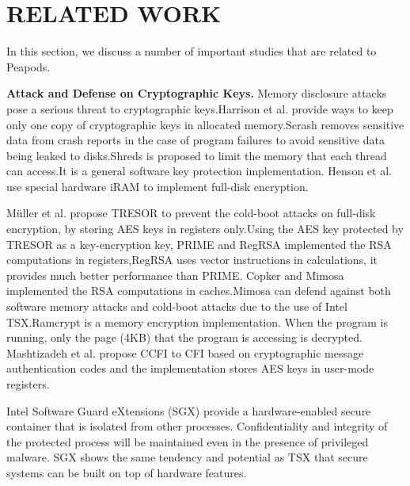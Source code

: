 
\section{RELATED WORK}
In this section, we discuss a number of important studies that are related to Peapods.

\textbf{Attack and Defense on Cryptographic Keys.}
Memory disclosure attacks pose a serious threat to cryptographic keys.Harrison et al. provide ways to keep only one copy of cryptographic keys in allocated memory\cite{Harrison2007Protecting}.Scrash removes sensitive data from crash reports in the case of program failures to avoid sensitive data being leaked to disks\cite{Broadwell2003Scrash}.Shreds\cite{Chen2016Shreds} is proposed to limit the memory that each thread can access.It is a general software key protection implementation. Henson et al. use special hardware iRAM to implement full-disk encryption\cite{Henson2013Beyond}.

M{\"u}ller et al. propose TRESOR\cite{Freiling2011TRESOR} to prevent the cold-boot attacks on full-disk encryption, by storing AES keys in registers only.Using the AES key protected by TRESOR as a key-encryption key, PRIME\cite{Garmany2013PRIME} and RegRSA\cite{Zhao2016RegRSA} implemented the RSA computations in registers,RegRSA uses vector instructions in calculations, it provides much better performance than PRIME.  Copker\cite{Guan2014Copker} and Mimosa\cite{Guan2015Protecting} implemented the RSA computations in caches.Mimosa can defend against both software memory attacks and cold-boot attacks due to the use of Intel TSX\cite{extensions}.Ramcrypt\cite{Drescher2016RamCrypt} is a memory encryption implementation. When the program is running, only the page (4KB) that the program is accessing is decrypted. Mashtizadeh et al. propose CCFI\cite{Mashtizadeh2015CCFI} to CFI based on cryptographic message authentication codes and the implementation stores AES keys in user-mode registers.

Intel Software Guard eXtensions (SGX) provide a hardware-enabled secure container that is isolated from other processes\cite{sgx}. Confidentiality and integrity of the protected process will be maintained even in the presence of privileged malware. SGX shows the same tendency and potential as TSX that secure systems can be built on top of hardware features.

